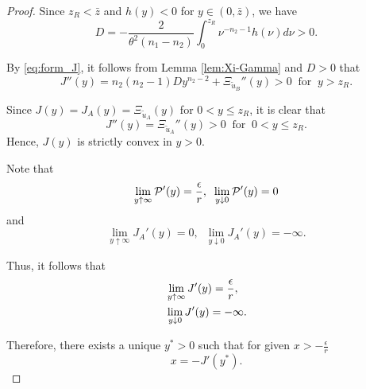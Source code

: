 \documentclass[a4paper,report, 11pt]{article}
\def\e{\epsilon}
\def\t{\theta}
\begin{document}
\begin{proof}
	Since $z_R<\bar{z}$ and $h(y)<0$ for $y\in(0,\bar{z})$, we have 
	\begin{equation*}
	D = -\dfrac{2}{\t^2(n_1-n_2)}\int_0^{z_R}\nu^{-n_2-1}{h}(\nu)d\nu>0. 
	\end{equation*}
	
	
	
By \eqref{eq:form_J},	it follows from Lemma \ref{lem:Xi-Gamma} and $D>0$ that 
	\begin{equation*}
	J''(y) = n_2(n_2-1)Dy^{n_2-2} +\Xi_{\tilde{u}_B}''(y) >0\;\;\mbox{for}\;\;y>z_R.
	\end{equation*}
	
	Since $J(y)=J_A(y)=\Xi_{\tilde{u}_A}(y)$ for $0<y\le z_R$, it is clear that 
	\begin{equation*}
	J''(y) =\Xi_{\tilde{u}_A}''(y) >0\;\;\mbox{for}\;\;0<y\le z_R. 
	\end{equation*}
	Hence, $J(y)$ is strictly convex in $y>0$. 
	
	Note that 
	\begin{equation*}
	\lim_{y\uparrow \infty}{\cal P}'(y)=\dfrac{\e}{r},\;\;\lim_{y\downarrow 0}{\cal P}'(y)=0
	\end{equation*}
	and 
	\begin{equation*}
	\lim_{y\uparrow \infty}J_A'(y)=0,\;\;\lim_{y\downarrow 0}J_A'(y)=-\infty.
	\end{equation*}
	
	Thus, it follows that 
	\begin{align*}
	&\lim_{y\uparrow \infty} {J}'(y)=\dfrac{\e}{r},\vspace{2mm}\\
	&\lim_{y\downarrow 0} {J}'(y)=-\infty.
	\end{align*}
	
	Therefore, there exists a unique $y^*>0$ such that for given $x>-\frac{\e}{r}$
	$$
	x = -J'(y^*). 
	$$
	

\end{proof}
\end{document}
